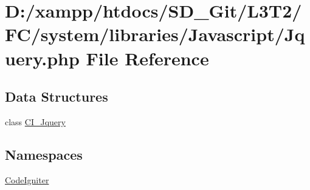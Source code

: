 \hypertarget{system_2libraries_2_javascript_2_jquery_8php}{}\section{D\+:/xampp/htdocs/\+S\+D\+\_\+\+Git/\+L3\+T2/\+F\+C/system/libraries/\+Javascript/\+Jquery.php File Reference}
\label{system_2libraries_2_javascript_2_jquery_8php}
\subsection*{Data Structures}
\begin{DoxyCompactItemize}
\item 
class \hyperlink{class_c_i___jquery}{C\+I\+\_\+\+Jquery}
\end{DoxyCompactItemize}
\subsection*{Namespaces}
\begin{DoxyCompactItemize}
\item 
 \hyperlink{namespace_code_igniter}{Code\+Igniter}
\end{DoxyCompactItemize}
